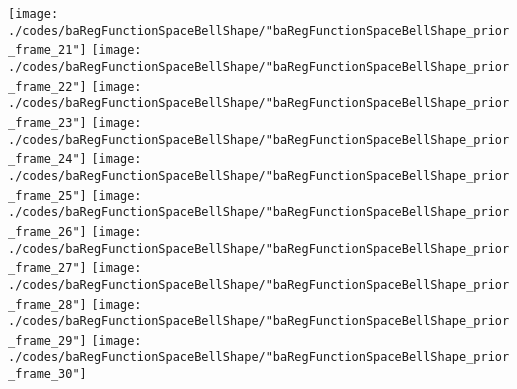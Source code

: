 \begin{frame}{\insertsection}
\begin{center}
{\begin{animateinline}{15}
				 \texttt{[image: ./codes/baRegFunctionSpaceBellShape/"baRegFunctionSpaceBellShape\_prior\_frame\_21"]}\newframe
				 \texttt{[image: ./codes/baRegFunctionSpaceBellShape/"baRegFunctionSpaceBellShape\_prior\_frame\_22"]}\newframe
				 \texttt{[image: ./codes/baRegFunctionSpaceBellShape/"baRegFunctionSpaceBellShape\_prior\_frame\_23"]}\newframe
				 \texttt{[image: ./codes/baRegFunctionSpaceBellShape/"baRegFunctionSpaceBellShape\_prior\_frame\_24"]}\newframe
				 \texttt{[image: ./codes/baRegFunctionSpaceBellShape/"baRegFunctionSpaceBellShape\_prior\_frame\_25"]}\newframe
				 \texttt{[image: ./codes/baRegFunctionSpaceBellShape/"baRegFunctionSpaceBellShape\_prior\_frame\_26"]}\newframe
				 \texttt{[image: ./codes/baRegFunctionSpaceBellShape/"baRegFunctionSpaceBellShape\_prior\_frame\_27"]}\newframe
				 \texttt{[image: ./codes/baRegFunctionSpaceBellShape/"baRegFunctionSpaceBellShape\_prior\_frame\_28"]}\newframe
				 \texttt{[image: ./codes/baRegFunctionSpaceBellShape/"baRegFunctionSpaceBellShape\_prior\_frame\_29"]}\newframe
				 \texttt{[image: ./codes/baRegFunctionSpaceBellShape/"baRegFunctionSpaceBellShape\_prior\_frame\_30"]}
			 \end{animateinline}
			}
	\end{center}
    
\end{frame}

